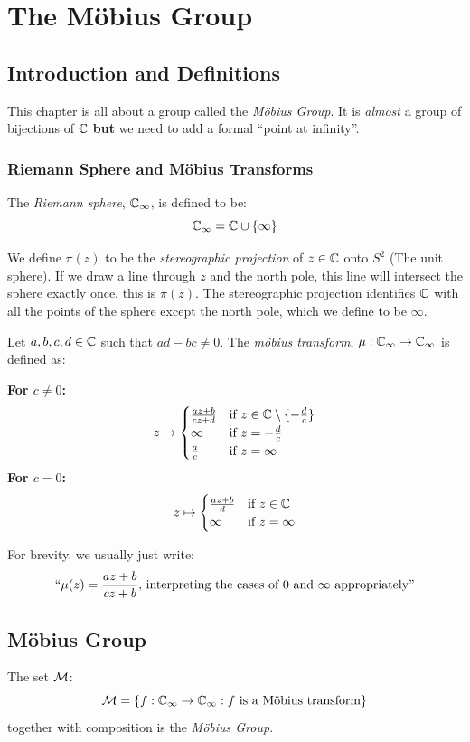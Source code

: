 \documentclass[../main.tex]{subfiles}
\begin{document}
\chapter{The M\"obius Group}
\section{Introduction and Definitions}
This chapter is all about a group called the \textit{M\"obius Group}.
It is \textit{almost} a group of bijections of $\mathbb{C}$ \textbf{but} we need to add a formal ``point at infinity''.
\subsection{Riemann Sphere and M\"obius Transforms}
\begin{definition}
  The \textit{Riemann sphere}, $\mathbb{C}_{\infty}$, is defined to be:
  \[
    \mathbb{C}_{\infty} = \mathbb{C} \cup \{\infty\}
  \]
\end{definition}
We define $\pi(z)$ to be the \textit{stereographic projection} of $z \in \mathbb{C}$ onto $S^2$ (The unit sphere).
If we draw a line through $z$ and the north pole, this line will intersect the sphere exactly once, this is $\pi(z)$.
The stereographic projection identifies $\mathbb{C}$ with all the points of the sphere except the north pole, which we define to be $\infty$.
\begin{definition}
  Let $a, b, c, d \in \mathbb{C}$ such that $ad - bc \neq 0$.
  The \textit{m\"obius transform}, $\mu: \mathbb{C}_{\infty} \to \mathbb{C}_{\infty}$ is defined as:

  \textbf{For $c \neq 0$:}
  \[
    z \mapsto \begin{cases}
    \frac{az + b}{cz + d} & \text{if $z \in \mathbb{C} \setminus \{-\frac{d}{c}\}$} \\
    \infty & \text{if $z = -\frac{d}{c}$} \\
    \frac{a}{c} & \text{if $z = \infty$}
    \end{cases}
  \]
  \textbf{For $c = 0$:}
  \[
    z \mapsto \begin{cases}
    \frac{az + b}{d} & \text{if $z \in \mathbb{C}$} \\
    \infty & \text{if $z = \infty$}
    \end{cases}
  \]
\end{definition}
For brevity, we usually just write:
\[
  ``\mu(z) = \frac{az + b}{cz + b} \text{, interpreting the cases of $0$ and $\infty$ appropriately''}
\]
\section{M\"obius Group}
\begin{definition}
  The set $\mathcal{M}$:
  \[
    \mathcal{M} = \{f: \mathbb{C}_{\infty} \to \mathbb{C}_{\infty}: f \text{ is a M\"obius transform}\}
  \]
  together with composition is the \textit{M\"obius Group}.
\end{definition}
\end{document}
